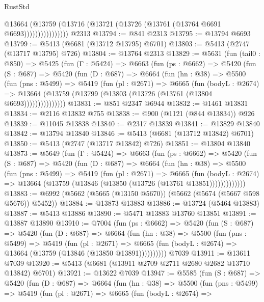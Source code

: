 \begin{lexlean}{RustStd}
\begin{coremodule}
                      @13664
                        (@13759 (@13716 (@13721 (@13726 (@13761 (@13764 @6691 @6693))))))))))))))))
    @2313
@13794 := @841 @2313
@13795 := @13794 @6693
@13799 := @5413 (@6681 (@13712 @13795) @6701)
@13803 := @5413 (@2747 (@13717 @13795) @726)
@13804 := @13764 @2313
@13829 := @5631
    (fun (tail0 : @850) =>
    @5425
      (fun (Γ : @5424) =>
      @6663
        (fun (ps : @6662) =>
        @5420
          (fun (S : @687) =>
          @5420
            (fun (D : @687) =>
            @6664
              (fun (hn : @38) =>
              @5500
                (fun (pns : @5499) =>
                @5419
                  (fun (pl : @2671) =>
                  @6665
                    (fun (bodyL : @2674) =>
                    @13664 (@13759 (@13799 (@13803 (@13726 (@13761 (@13804 @6693)))))))))))))))
@13831 := @851 @2347 @6944
@13832 := @1461 @13831
@13834 := @2116 @13832 @755
@13838 := @900 (@1121 (@844 @13834)) @926
@13839 := @11045 @13838
@13840 := @2317 @13839
@13841 := @13829 @13840
@13842 := @13794 @13840
@13846 := @5413 (@6681 (@13712 @13842) @6701)
@13850 := @5413 (@2747 (@13717 @13842) @726)
@13851 := @13804 @13840
@13873 := @5649
    (fun (Γ : @5424) =>
    @6663
      (fun (ps : @6662) =>
      @5420
        (fun (S : @687) =>
        @5420
          (fun (D : @687) =>
          @6664
            (fun (hn : @38) =>
            @5500
              (fun (pns : @5499) =>
              @5419
                (fun (pl : @2671) =>
                @6665
                  (fun (bodyL : @2674) =>
                  @13664 (@13759 (@13846 (@13850 (@13726 (@13761 @13851)))))))))))))
@13883 := @6992 (@5662 (@5665 (@13150 @5670)) (@5662 (@5674 (@5667 @598 @5676)) @5452))
@13884 := @13873 @13883
@13886 := @13724 (@5464 @13883)
@13887 := @5413 @13886
@13890 := @5471 @13883 @13760 @13851
@13891 := @13887 @13890
@13910 := @7004
    (fun (ps : @6662) =>
    @5420
      (fun (S : @687) =>
      @5420
        (fun (D : @687) =>
        @6664
          (fun (hn : @38) =>
          @5500
            (fun (pns : @5499) =>
            @5419
              (fun (pl : @2671) =>
              @6665 (fun (bodyL : @2674) => @13664 (@13759 (@13846 (@13850 @13891))))))))))
    @7039
@13911 := @13611 @7039
@13920 := @5413 (@6681 (@13911 @2709 @2711 @2680 @2682 @13710 @13842) @6701)
@13921 := @13622 @7039
@13947 := @5585
    (fun (S : @687) =>
    @5420
      (fun (D : @687) =>
      @6664
        (fun (hn : @38) =>
        @5500
          (fun (pns : @5499) =>
          @5419
            (fun (pl : @2671) =>
            @6665
              (fun (bodyL : @2674) =>

\end{coremodule}
\end{lexlean}
